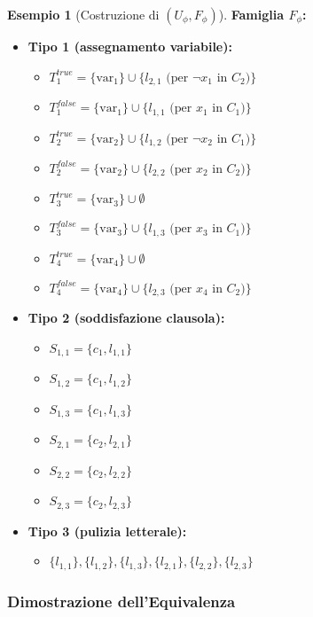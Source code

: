 \documentclass[a4paper]{article}
\theoremstyle{definition} %
\newtheorem{example}{Esempio}
\begin{document}
\begin{example}[Costruzione di $(U_\phi, F_\phi)$]
\textbf{Famiglia $F_\phi$:}
\begin{itemize}
    \item \textbf{Tipo 1 (assegnamento variabile):}
    \begin{itemize}
        \item $T_1^{true} = \{\text{var}_1\} \cup \{l_{2,1} \text{ (per } \neg x_1 \text{ in } C_2)\}$
        \item $T_1^{false} = \{\text{var}_1\} \cup \{l_{1,1} \text{ (per } x_1 \text{ in } C_1)\}$
        \item $T_2^{true} = \{\text{var}_2\} \cup \{l_{1,2} \text{ (per } \neg x_2 \text{ in } C_1)\}$
        \item $T_2^{false} = \{\text{var}_2\} \cup \{l_{2,2} \text{ (per } x_2 \text{ in } C_2)\}$
        \item $T_3^{true} = \{\text{var}_3\} \cup \emptyset$
        \item $T_3^{false} = \{\text{var}_3\} \cup \{l_{1,3} \text{ (per } x_3 \text{ in } C_1)\}$
        \item $T_4^{true} = \{\text{var}_4\} \cup \emptyset$
        \item $T_4^{false} = \{\text{var}_4\} \cup \{l_{2,3} \text{ (per } x_4 \text{ in } C_2)\}$
    \end{itemize}
    \item \textbf{Tipo 2 (soddisfazione clausola):}
    \begin{itemize}
        \item $S_{1,1} = \{c_1, l_{1,1}\}$
        \item $S_{1,2} = \{c_1, l_{1,2}\}$
        \item $S_{1,3} = \{c_1, l_{1,3}\}$
        \item $S_{2,1} = \{c_2, l_{2,1}\}$
        \item $S_{2,2} = \{c_2, l_{2,2}\}$
        \item $S_{2,3} = \{c_2, l_{2,3}\}$
    \end{itemize}
    \item \textbf{Tipo 3 (pulizia letterale):}
    \begin{itemize}
        \item $\{l_{1,1}\}, \{l_{1,2}\}, \{l_{1,3}\}, \{l_{2,1}\}, \{l_{2,2}\}, \{l_{2,3}\}$
    \end{itemize}
\end{itemize}
\end{example}

\subsubsection{Dimostrazione dell'Equivalenza}
\end{document}
